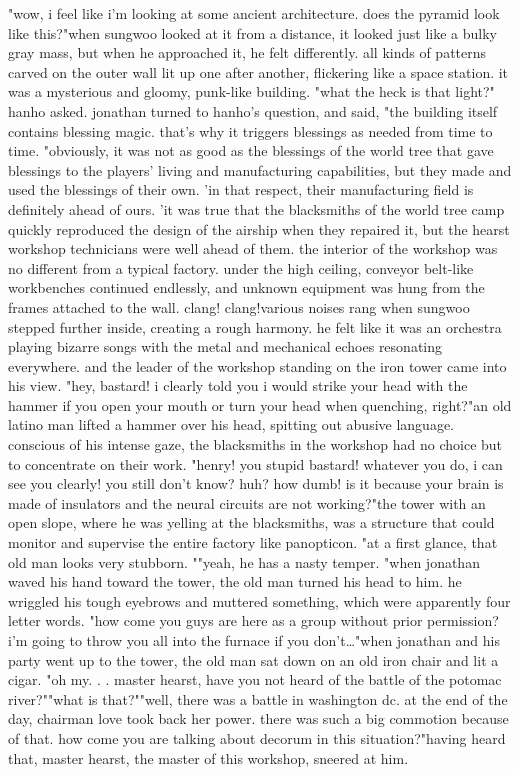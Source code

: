 "wow, i feel like i'm looking at some ancient architecture.
 does the pyramid look like this?"when sungwoo looked at it from a distance, it looked just like a bulky gray mass, but when he approached it, he felt differently.
all kinds of patterns carved on the outer wall lit up one after another, flickering like a space station.
 it was a mysterious and gloomy, punk-like building.
"what the heck is that light?" hanho asked.
jonathan turned to hanho's question, and said, "the building itself contains blessing magic.
 that's why it triggers blessings as needed from time to time.
"obviously, it was not as good as the blessings of the world tree that gave blessings to the players' living and manufacturing capabilities, but they made and used the blessings of their own.
'in that respect, their manufacturing field is definitely ahead of ours.
'it was true that the blacksmiths of the world tree camp quickly reproduced the design of the airship when they repaired it, but the hearst workshop technicians were well ahead of them.
the interior of the workshop was no different from a typical factory.
 under the high ceiling, conveyor belt-like workbenches continued endlessly, and unknown equipment was hung from the frames attached to the wall.
clang! clang!various noises rang when sungwoo stepped further inside, creating a rough harmony.
 he felt like it was an orchestra playing bizarre songs with the metal and mechanical echoes resonating everywhere.
 and the leader of the workshop standing on the iron tower came into his view.
"hey, bastard! i clearly told you i would strike your head with the hammer if you open your mouth or turn your head when quenching, right?"an old latino man lifted a hammer over his head, spitting out abusive language.
conscious of his intense gaze, the blacksmiths in the workshop had no choice but to concentrate on their work.
"henry! you stupid bastard! whatever you do, i can see you clearly! you still don't know? huh? how dumb! is it because your brain is made of insulators and the neural circuits are not working?"the tower with an open slope, where he was yelling at the blacksmiths, was a structure that could monitor and supervise the entire factory like panopticon.
"at a first glance, that old man looks very stubborn.
""yeah, he has a nasty temper.
"when jonathan waved his hand toward the tower, the old man turned his head to him.
he wriggled his tough eyebrows and muttered something, which were apparently four letter words.
"how come you guys are here as a group without prior permission? i'm going to throw you all into the furnace if you don't…"when jonathan and his party went up to the tower, the old man sat down on an old iron chair and lit a cigar.
"oh my.
.
.
master hearst, have you not heard of the battle of the potomac river?""what is that?""well, there was a battle in washington dc.
 at the end of the day, chairman love took back her power.
 there was such a big commotion because of that.
 how come you are talking about decorum in this situation?"having heard that, master hearst, the master of this workshop, sneered at him.



